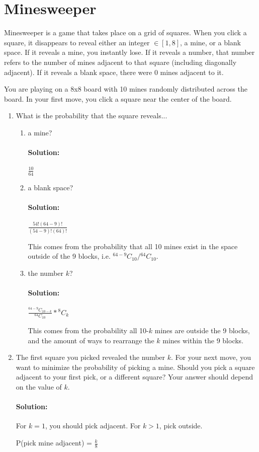 \documentclass[11pt, notitlepage]{article}
\newcommand{\Question}[1]{\newpage\section{#1}}
\newcommand*{\Comb}[2]{{}^{#1}C_{#2}}%
\newenvironment{solution}{\paragraph{Solution:}}{\hfill}
\begin{document}
\Question{Minesweeper}

Minesweeper is a game that takes place on a grid of squares. When you click a square, it disappears to reveal either an integer $\in [1,8]$, a mine, or a blank space. If it reveals a mine, you instantly lose. If it reveals a number, that number refers to the number of mines adjacent to that square (including diagonally adjacent). If it reveals a blank space, there were 0 mines adjacent to it.

You are playing on a 8x8 board with 10 mines randomly distributed across the board. In your first move, you click a square near the center of the board.

\begin{enumerate}[label=(\alph*)]
	\item What is the probability that the square reveals...
	\begin{enumerate}[label=\roman*.)]
		\item a mine?
		\begin{solution}
			$\frac{10}{64}$
		\end{solution}
		\item a blank space?
		\begin{solution}
			$\frac{54!(64-9)!}{(54-9)!(64)!}$
			
			This comes from the probability that all 10 mines exist in the space outside of the 9 blocks, i.e. $\Comb{64-9}{10}/\Comb{64}{10}$.
		\end{solution}
		\item the number $k$?
		\begin{solution}
			$\frac{\Comb{64-9}{10-k}}{\Comb{64}{10}}*\Comb{8}{k}$
			
			This comes from the probability all 10-$k$ mines are outside the 9 blocks, and the amount of ways to rearrange the $k$ mines within the 9 blocks.
		\end{solution}
	\end{enumerate}

	\item The first square you picked revealed the number $k$. For your next move, you want to minimize the probability of picking a mine. Should you pick a square adjacent to your first pick, or a different square? Your answer should depend on the value of $k$.
	\begin{solution} For $k=1$, you should pick adjacent. For $k>1$, pick outside.
	
	P(pick mine adjacent) = $\frac{k}{8}$
	

\end{solution}
\end{enumerate}
\end{document}
